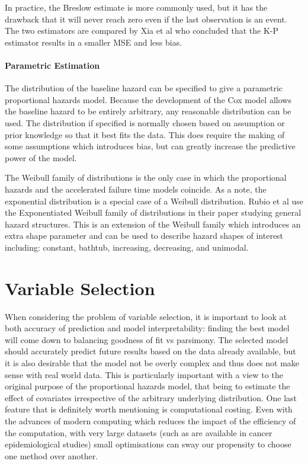 In practice, the Breslow estimate is more commonly used, but it has the drawback that it will never reach zero even if the last observation is an event. The two estimators are compared by Xia et al  who concluded that the K-P estimator results in a smaller MSE and less bias. 

\subsection{Parametric Estimation}

The distribution of the baseline hazard can be specified to give a parametric proportional hazards model. Because the development of the Cox model allows the baseline hazard to be entirely arbitrary, any reasonable distribution can be used. The distribution if specified is normally chosen based on assumption or prior knowledge so that it best fits the data. This does require the making of some assumptions which introduces bias, but can greatly increase the predictive power of the model.

The Weibull family of distributions is the only case in which the proportional hazards and the accelerated failure time models coincide. As a note, the exponential distribution is a special case of a Weibull distribution. Rubio et al  use the Exponentiated Weibull family of distributions in their paper studying general hazard structures. This is an extension of the Weibull family which introduces an extra shape parameter and can be used to describe hazard shapes of interest including: constant, bathtub, increasing, decreasing, and unimodal.

\newpage
\part{Variable Selection}

When considering the problem of variable selection, it is important to look at both accuracy of prediction and model interpretability: finding the best model will come down to balancing goodness of fit vs parsimony. The selected model should accurately predict future results based on the data already available, but it is also desirable that the model not be overly complex and thus does not make sense with real world data. This is particularly important with a view to the original purpose of the proportional hazards model, that being to estimate the effect of covariates irrespective of the arbitrary underlying distribution. One last feature that is definitely worth mentioning is computational costing. Even with the advances of modern computing which reduces the impact of the efficiency of the computation, with very large datasets (such as are available in cancer epidemiological studies) small optimisations can sway our propensity to choose one method over another.

